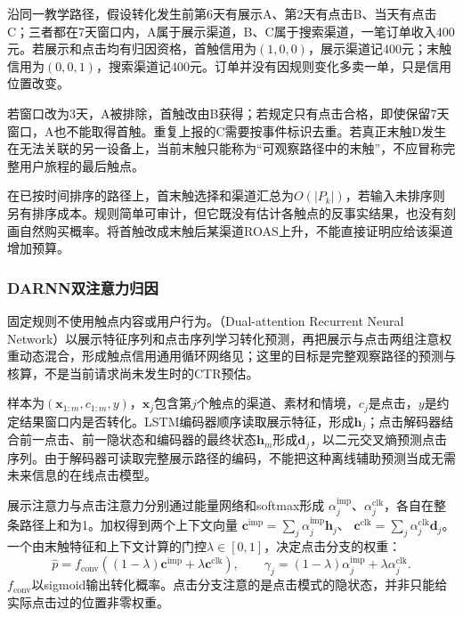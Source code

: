 沿同一教学路径，假设转化发生前第6天有展示A、第2天有点击B、当天有点击C；三者都在7天窗口内，A属于展示渠道，B、C属于搜索渠道，一笔订单收入400元。若展示和点击均有归因资格，首触信用为$(1,0,0)$，展示渠道记400元；末触信用为$(0,0,1)$，搜索渠道记400元。订单并没有因规则变化多卖一单，只是信用位置改变。

若窗口改为3天，A被排除，首触改由B获得；若规定只有点击合格，即使保留7天窗口，A也不能取得首触。重复上报的C需要按事件标识去重。若真正末触D发生在无法关联的另一设备上，当前末触只能称为“可观察路径中的末触”，不应冒称完整用户旅程的最后触点。

在已按时间排序的路径上，首末触选择和渠道汇总为$O(|P_k|)$，若输入未排序则另有排序成本。规则简单可审计，但它既没有估计各触点的反事实结果，也没有刻画自然购买概率。将首触改成末触后某渠道ROAS上升，不能直接证明应给该渠道增加预算。

\subsubsection{DARNN双注意力归因}
\label{sec:rs-advertising-darnn}

固定规则不使用触点内容或用户行为。（Dual-attention Recurrent Neural Network）以展示特征序列和点击序列学习转化预测，再把展示与点击两组注意权重动态混合，形成触点信用通用循环网络见；这里的目标是完整观察路径的预测与核算，不是当前请求尚未发生时的CTR预估。

样本为$(\bm{x}_{1:m},c_{1:m},y)$，$\bm{x}_j$包含第$j$个触点的渠道、素材和情境，$c_j$是点击，$y$是约定结果窗口内是否转化。LSTM编码器顺序读取展示特征，形成$\bm{h}_j$；点击解码器结合前一点击、前一隐状态和编码器的最终状态$\bm{h}_m$形成$\bm{d}_j$，以二元交叉熵预测点击序列。由于解码器可读取完整展示路径的编码，不能把这种离线辅助预测当成无需未来信息的在线点击模型。

展示注意力与点击注意力分别通过能量网络和softmax形成
$\alpha_j^{\mathrm{imp}}$、$\alpha_j^{\mathrm{clk}}$，各自在整条路径上和为1。加权得到两个上下文向量
$\bm{c}^{\mathrm{imp}}=\sum_j\alpha_j^{\mathrm{imp}}\bm{h}_j$、
$\bm{c}^{\mathrm{clk}}=\sum_j\alpha_j^{\mathrm{clk}}\bm{d}_j$。
一个由末触特征和上下文计算的门控$\lambda\in[0,1]$，决定点击分支的权重：
\begin{equation}
  \widehat p
    =f_{\mathrm{conv}}\!\left(
       (1-\lambda)\bm{c}^{\mathrm{imp}}
          +\lambda\bm{c}^{\mathrm{clk}}\right),\qquad
  \gamma_j=(1-\lambda)\alpha_j^{\mathrm{imp}}
                  +\lambda\alpha_j^{\mathrm{clk}}.
  \label{eq:rs-advertising-darnn}
\end{equation}
$f_{\mathrm{conv}}$以sigmoid输出转化概率。点击分支注意的是点击模式的隐状态，并非只能给实际点击过的位置非零权重。

